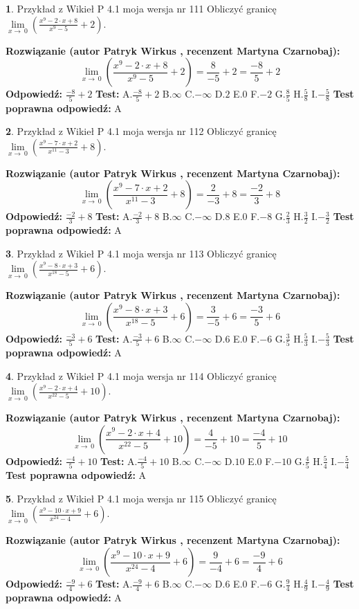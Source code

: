 \documentclass[12pt, a4paper]{article}
\theoremstyle{definition} %
\newtheorem{zad}{}
\newcommand{\zadStart}[1]{\begin{zad}#1\newline}
\newcommand{\zadStop}{\end{zad}}
\newcommand{\rozwStart}[2]{\noindent \textbf{Rozwiązanie (autor #1 , recenzent #2): }\newline}
\newcommand{\rozwStop}{\newline}
\newcommand{\odpStart}{\noindent \textbf{Odpowiedź:}\newline}
\newcommand{\odpStop}{\newline}
\newcommand{\testStart}{\noindent \textbf{Test:}\newline}
\newcommand{\testStop}{\newline}
\newcommand{\kluczStart}{\noindent \textbf{Test poprawna odpowiedź:}\newline}
\newcommand{\kluczStop}{\newline}
\begin{document}
\zadStart{Przykład z Wikieł P 4.1 moja wersja nr 111}
Obliczyć granicę $\lim\limits_{x\to\ 0}(\frac{x^{9}-2 \cdot x +8}{x^{9}-5}+2)$.
\zadStop
\rozwStart{Patryk Wirkus}{Martyna Czarnobaj}
$$\lim\limits_{x\to\ 0}(\frac{x^{9}-2 \cdot x +8}{x^{9}-5}+2)=\frac{8}{-5}+2=\frac{-8}{5}+2$$
\rozwStop
\odpStart
$\frac{-8}{5}+2$
\odpStop
\testStart
A.$\frac{-8}{5}+2$
B.$\infty$
C.$-\infty$
D.$2$
E.$0$
F.$-2$
G.$\frac{8}{5}$
H.$\frac{5}{8}$
I.$-\frac{5}{8}$
\testStop
\kluczStart
A
\kluczStop



\zadStart{Przykład z Wikieł P 4.1 moja wersja nr 112}
Obliczyć granicę $\lim\limits_{x\to\ 0}(\frac{x^{9}-7 \cdot x +2}{x^{11}-3}+8)$.
\zadStop
\rozwStart{Patryk Wirkus}{Martyna Czarnobaj}
$$\lim\limits_{x\to\ 0}(\frac{x^{9}-7 \cdot x +2}{x^{11}-3}+8)=\frac{2}{-3}+8=\frac{-2}{3}+8$$
\rozwStop
\odpStart
$\frac{-2}{3}+8$
\odpStop
\testStart
A.$\frac{-2}{3}+8$
B.$\infty$
C.$-\infty$
D.$8$
E.$0$
F.$-8$
G.$\frac{2}{3}$
H.$\frac{3}{2}$
I.$-\frac{3}{2}$
\testStop
\kluczStart
A
\kluczStop



\zadStart{Przykład z Wikieł P 4.1 moja wersja nr 113}
Obliczyć granicę $\lim\limits_{x\to\ 0}(\frac{x^{9}-8 \cdot x +3}{x^{18}-5}+6)$.
\zadStop
\rozwStart{Patryk Wirkus}{Martyna Czarnobaj}
$$\lim\limits_{x\to\ 0}(\frac{x^{9}-8 \cdot x +3}{x^{18}-5}+6)=\frac{3}{-5}+6=\frac{-3}{5}+6$$
\rozwStop
\odpStart
$\frac{-3}{5}+6$
\odpStop
\testStart
A.$\frac{-3}{5}+6$
B.$\infty$
C.$-\infty$
D.$6$
E.$0$
F.$-6$
G.$\frac{3}{5}$
H.$\frac{5}{3}$
I.$-\frac{5}{3}$
\testStop
\kluczStart
A
\kluczStop



\zadStart{Przykład z Wikieł P 4.1 moja wersja nr 114}
Obliczyć granicę $\lim\limits_{x\to\ 0}(\frac{x^{9}-2 \cdot x +4}{x^{22}-5}+10)$.
\zadStop
\rozwStart{Patryk Wirkus}{Martyna Czarnobaj}
$$\lim\limits_{x\to\ 0}(\frac{x^{9}-2 \cdot x +4}{x^{22}-5}+10)=\frac{4}{-5}+10=\frac{-4}{5}+10$$
\rozwStop
\odpStart
$\frac{-4}{5}+10$
\odpStop
\testStart
A.$\frac{-4}{5}+10$
B.$\infty$
C.$-\infty$
D.$10$
E.$0$
F.$-10$
G.$\frac{4}{5}$
H.$\frac{5}{4}$
I.$-\frac{5}{4}$
\testStop
\kluczStart
A
\kluczStop



\zadStart{Przykład z Wikieł P 4.1 moja wersja nr 115}
Obliczyć granicę $\lim\limits_{x\to\ 0}(\frac{x^{9}-10 \cdot x +9}{x^{24}-4}+6)$.
\zadStop
\rozwStart{Patryk Wirkus}{Martyna Czarnobaj}
$$\lim\limits_{x\to\ 0}(\frac{x^{9}-10 \cdot x +9}{x^{24}-4}+6)=\frac{9}{-4}+6=\frac{-9}{4}+6$$
\rozwStop
\odpStart
$\frac{-9}{4}+6$
\odpStop
\testStart
A.$\frac{-9}{4}+6$
B.$\infty$
C.$-\infty$
D.$6$
E.$0$
F.$-6$
G.$\frac{9}{4}$
H.$\frac{4}{9}$
I.$-\frac{4}{9}$
\testStop
\kluczStart
A
\kluczStop
\end{document}
